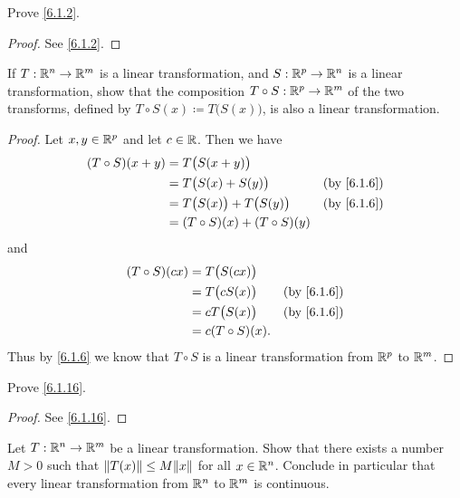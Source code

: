 \exercisesection

\begin{ex}\label{ex:6.1.1}
  Prove \cref{6.1.2}.
\end{ex}

\begin{proof}
  See \cref{6.1.2}.
\end{proof}

\begin{ex}\label{ex:6.1.2}
  If \(T : \mathbb{R}^n \to \mathbb{R}^m\) is a linear transformation, and \(S : \mathbb{R}^p \to \mathbb{R}^n\) is a linear transformation, show that the composition \(T \circ S : \mathbb{R}^p \to \mathbb{R}^m\) of the two transforms, defined by \(T \circ S(x) \coloneqq T\big(S(x)\big)\), is also a linear transformation.
\end{ex}

\begin{proof}
  Let \(x, y \in \mathbb{R}^p\) and let \(c \in \mathbb{R}\).
  Then we have
  \begin{align*}
    (T \circ S)(x + y) & = T\big(S(x + y)\big)                                          \\
                       & = T\big(S(x) + S(y)\big)            & \text{(by \cref{6.1.6})} \\
                       & = T\big(S(x)\big) + T\big(S(y)\big) & \text{(by \cref{6.1.6})} \\
                       & = (T \circ S)(x) + (T \circ S)(y)
  \end{align*}
  and
  \begin{align*}
    (T \circ S)(cx) & = T\big(S(cx)\big)                             \\
                    & = T\big(c S(x)\big) & \text{(by \cref{6.1.6})} \\
                    & = c T\big(S(x)\big) & \text{(by \cref{6.1.6})} \\
                    & = c (T \circ S)(x).
  \end{align*}
  Thus by \cref{6.1.6} we know that \(T \circ S\) is a linear transformation from \(\mathbb{R}^p\) to \(\mathbb{R}^m\).
\end{proof}

\begin{ex}\label{ex:6.1.3}
  Prove \cref{6.1.16}.
\end{ex}

\begin{proof}
  See \cref{6.1.16}.
\end{proof}

\begin{ex}\label{ex:6.1.4}
  Let \(T : \mathbb{R}^n \to \mathbb{R}^m\) be a linear transformation.
  Show that there exists a number \(M > 0\) such that \(\norm*{T(x)} \leq M \norm*{x}\) for all \(x \in \mathbb{R}^n\).
  Conclude in particular that every linear transformation from \(\mathbb{R}^n\) to \(\mathbb{R}^m\) is continuous.
\end{ex}

